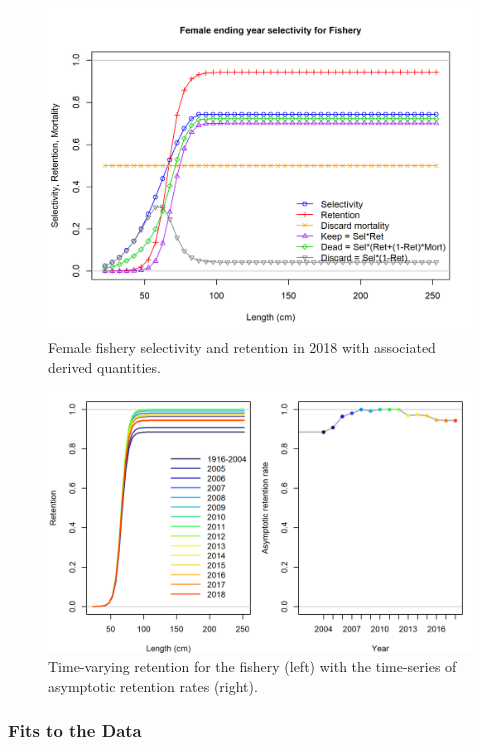 \documentclass[12pt,]{article}
\begin{document}
\begin{figure}
\centering
\includegraphics{r4ss/plots_mod1/sel09_len_flt1sex1.png}
\caption{Female fishery selectivity and retention in 2018 with
associated derived quantities. \label{fig:sel09_len_flt1sex1}}
\end{figure}

\begin{figure}
\centering
\includegraphics{Figures/retention.png}
\caption{Time-varying retention for the fishery (left) with the
time-series of asymptotic retention rates (right).
\label{fig:retention}}
\end{figure}

\FloatBarrier

\hypertarget{fits-to-the-data-1}{%
\subsubsection{Fits to the Data}\label{fits-to-the-data-1}}
\end{document}
